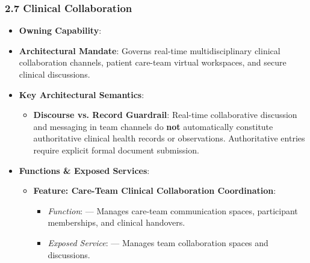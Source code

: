 \label{rad:ise:137}

\par\smallskip
{}\label{rad:ise:139}
\subsubsection*{2.7 Clinical Collaboration}
\label{rad:ise:140}

\begin{itemize}

\item 
\textbf{Owning Capability}: \texttt{}



\item 
\textbf{Architectural Mandate}: Governs real-time multidisciplinary clinical collaboration channels, patient care-team virtual workspaces, and secure clinical discussions.



\item 
\textbf{Key Architectural Semantics}:


\begin{itemize}

\item 
\textbf{Discourse vs. Record Guardrail}: Real-time collaborative discussion and messaging in team channels do \textbf{not} automatically constitute authoritative clinical health records or observations. Authoritative entries require explicit formal document submission.



\end{itemize}


\item 
\textbf{Functions \& Exposed Services}:


\begin{itemize}

\item 
\textbf{Feature: Care-Team Clinical Collaboration Coordination}:


\begin{itemize}

\item 
\emph{Function}: \texttt{} — Manages care-team communication spaces, participant memberships, and clinical handovers.



\item 
\emph{Exposed Service}: \texttt{} — Manages team collaboration spaces and discussions.




\end{itemize}
\end{itemize}
\end{itemize}
